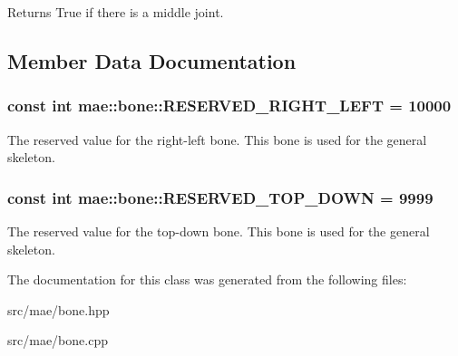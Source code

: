 \begin{DoxyReturn}{Returns}
True if there is a middle joint. 
\end{DoxyReturn}


\subsection{Member Data Documentation}
\hypertarget{classmae_1_1bone_a88742a35692365039e79b7b66445098c}{
\subsubsection[{R\-E\-S\-E\-R\-V\-E\-D\-\_\-\-R\-I\-G\-H\-T\-\_\-\-L\-E\-F\-T}]{\setlength{\rightskip}{0pt plus 5cm}const int mae\-::bone\-::\-R\-E\-S\-E\-R\-V\-E\-D\-\_\-\-R\-I\-G\-H\-T\-\_\-\-L\-E\-F\-T = 10000\hspace{0.3cm}{\ttfamily [static]}}}\label{classmae_1_1bone_a88742a35692365039e79b7b66445098c}
The reserved value for the right-\/left bone. This bone is used for the general skeleton. \hypertarget{classmae_1_1bone_a99d8ad741f1c2d4bd8ad199286c3911c}{
\subsubsection[{R\-E\-S\-E\-R\-V\-E\-D\-\_\-\-T\-O\-P\-\_\-\-D\-O\-W\-N}]{\setlength{\rightskip}{0pt plus 5cm}const int mae\-::bone\-::\-R\-E\-S\-E\-R\-V\-E\-D\-\_\-\-T\-O\-P\-\_\-\-D\-O\-W\-N = 9999\hspace{0.3cm}{\ttfamily [static]}}}\label{classmae_1_1bone_a99d8ad741f1c2d4bd8ad199286c3911c}
The reserved value for the top-\/down bone. This bone is used for the general skeleton. 

The documentation for this class was generated from the following files\-:\begin{DoxyCompactItemize}
\item 
src/mae/bone.\-hpp\item 
src/mae/bone.\-cpp\end{DoxyCompactItemize}
